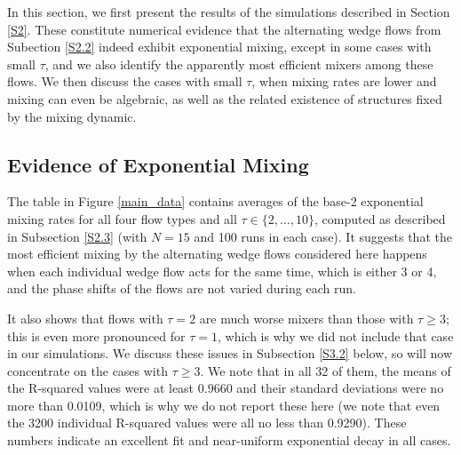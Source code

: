 \documentclass[12pt]{article}
\numberwithin{figure}{section}
\numberwithin{equation}{section}
\begin{document}
In this section, we first present the results of the simulations described in Section \ref{S2}.  These constitute numerical evidence that the alternating wedge flows from Subection \ref{S2.2} indeed exhibit exponential mixing, except in some cases with small $\tau$, and we also identify the apparently most efficient mixers among these flows.  We then discuss the cases with small $\tau$, when mixing rates are lower and mixing can even be algebraic, as well as the related existence of structures fixed by the mixing dynamic.

\subsection{Evidence of Exponential Mixing} \label{S3.1}

The table in Figure \ref{main_data} contains averages of the  base-2 exponential mixing rates  for all four flow types and all $\tau\in\{2,\dots,10\}$, computed as described in Subsection \ref{S2.3} (with $N=15$ and 100 runs in each case).  It suggests that the most efficient mixing by the alternating wedge flows considered here happens when each individual wedge flow acts for the same time, which is either 3 or 4, and the phase shifts of the flows are not varied during each run.

It also shows that flows with $\tau=2$ are much worse mixers than those with $\tau\ge 3$; this is even more pronounced for $\tau=1$, which is why we did not include that case in our simulations.  We discuss these issues in Subsection \ref{S3.2} below, so will now concentrate on the cases with $\tau\ge 3$.
We note that  in all 32 of them, the means of the R-squared values were at least $0.9660$ and their
 standard deviations were no more than 0.0109, which is why we do not report these here (we note that even the 3200 individual R-squared values were all no less than 0.9290).  These numbers indicate an excellent fit and near-uniform exponential decay in all cases. 
\end{document}
